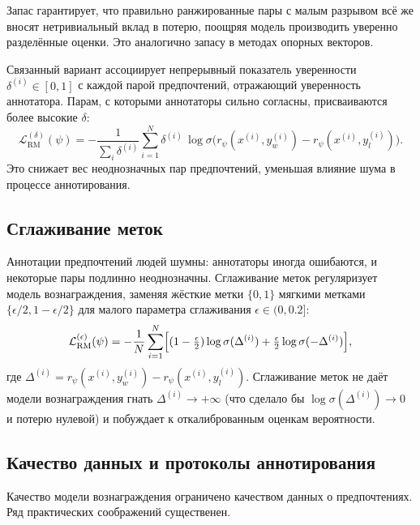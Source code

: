 Запас гарантирует, что правильно ранжированные пары с малым разрывом всё же вносят нетривиальный вклад в потерю, поощряя модель производить уверенно разделённые оценки. Это аналогично запасу в методах опорных векторов.

Связанный вариант ассоциирует непрерывный показатель уверенности $\delta^{(i)} \in [0, 1]$ с каждой парой предпочтений, отражающий уверенность аннотатора. Парам, с которыми аннотаторы сильно согласны, присваиваются более высокие $\delta$:
\begin{equation}
\label{eq:rm-weighted-loss}
\mathcal{L}_{\mathrm{RM}}^{(\delta)}(\psi)
= -\frac{1}{\sum_i \delta^{(i)}}\sum_{i=1}^{N}
\delta^{(i)}\,\log \sigma\!\bigl(r_\psi(x^{(i)}, y_w^{(i)}) - r_\psi(x^{(i)}, y_l^{(i)})\bigr).
\end{equation}
Это снижает вес неоднозначных пар предпочтений, уменьшая влияние шума в процессе аннотирования.

\subsection{Сглаживание меток}

Аннотации предпочтений людей шумны: аннотаторы иногда ошибаются, и некоторые пары подлинно неоднозначны. Сглаживание меток регуляризует модель вознаграждения, заменяя жёсткие метки $\{0,1\}$ мягкими метками $\{\epsilon/2, 1 - \epsilon/2\}$ для малого параметра сглаживания $\epsilon \in (0, 0.2]$:
\begin{equation}
\label{eq:rm-label-smooth}
\mathcal{L}_{\mathrm{RM}}^{(\epsilon)}(\psi)
= -\frac{1}{N}\sum_{i=1}^{N}
\Bigl[(1-\tfrac{\epsilon}{2})\log\sigma(\Delta^{(i)}) + \tfrac{\epsilon}{2}\log\sigma(-\Delta^{(i)})\Bigr],
\end{equation}
где $\Delta^{(i)} = r_\psi(x^{(i)}, y_w^{(i)}) - r_\psi(x^{(i)}, y_l^{(i)})$. Сглаживание меток не даёт модели вознаграждения гнать $\Delta^{(i)} \to +\infty$ (что сделало бы $\log\sigma(\Delta^{(i)}) \to 0$ и потерю нулевой) и побуждает к откалиброванным оценкам вероятности.

\subsection{Качество данных и протоколы аннотирования}

Качество модели вознаграждения ограничено качеством данных о предпочтениях. Ряд практических соображений существенен.

